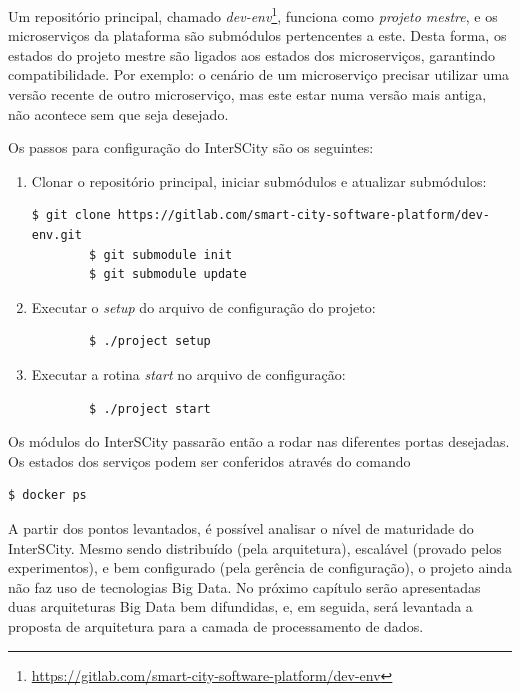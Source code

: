 Um repositório principal, chamado
\textit{dev-env}\footnote{\url{https://gitlab.com/smart-city-software-platform/dev-env}},
funciona como \textit{projeto mestre}, e os microserviços da plataforma são
submódulos pertencentes a este. Desta forma, os estados do projeto mestre são
ligados aos estados dos microserviços, garantindo compatibilidade. Por exemplo:
o cenário de um microserviço precisar utilizar uma versão recente de outro
microserviço, mas este estar numa versão mais antiga, não acontece sem que seja
desejado.

Os passos para configuração do InterSCity são os seguintes:

\lstset{
    tabsize=4,
    rulecolor=,
    language=bash,
    basicstyle=\scriptsize,
    columns=fixed,
    showstringspaces=false,
    breaklines=true
}
\begin{enumerate}
    \item Clonar o repositório principal, iniciar submódulos e atualizar submódulos:
        \begin{lstlisting}[basicstyle=\tiny,]
        $ git clone https://gitlab.com/smart-city-software-platform/dev-env.git
        $ git submodule init
        $ git submodule update
        \end{lstlisting}

    \item Executar o \textit{setup} do arquivo de configuração do projeto:
        \begin{lstlisting}
        $ ./project setup
        \end{lstlisting}

    \item Executar a rotina \textit{start} no arquivo de configuração:
        \begin{lstlisting}
        $ ./project start
        \end{lstlisting}
\end{enumerate}

Os módulos do InterSCity passarão então a rodar nas diferentes portas
desejadas. Os estados dos serviços podem ser conferidos através do comando
\begin{lstlisting}
$ docker ps
\end{lstlisting}

A partir dos pontos levantados, é possível analisar o nível de maturidade do
InterSCity. Mesmo sendo distribuído (pela arquitetura), escalável (provado
pelos experimentos), e bem configurado (pela gerência de configuração), o
projeto ainda não faz uso de tecnologias Big Data. No próximo capítulo serão
apresentadas duas arquiteturas Big Data bem difundidas, e, em seguida, será
levantada a proposta de arquitetura para a camada de processamento de dados.
